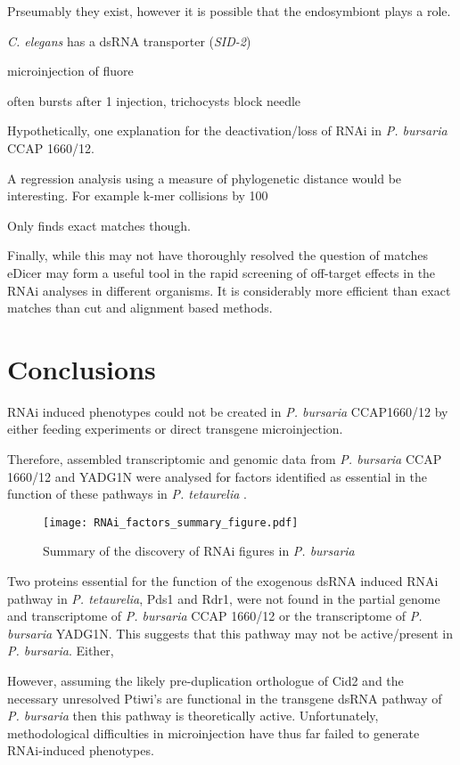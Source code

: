 Prseumably they exist, however it is possible that the endosymbiont plays a role.


\textit{C. elegans} has a dsRNA transporter (\textit{SID-2}) \citep{Nuez2012}


microinjection of fluore

often bursts after 1 injection, trichocysts block needle







Hypothetically, one explanation for the deactivation/loss
of RNAi in \textit{P. bursaria} CCAP 1660/12.




A regression analysis using a measure of phylogenetic distance would be interesting.
For example k-mer collisions by 100


Only finds exact matches though.




Finally, while this may not have thoroughly resolved the question of matches
eDicer may form a useful tool in the rapid screening of off-target effects
in the RNAi analyses in different organisms.   It is considerably
more efficient than exact matches 
than cut and alignment based methods. 





\section{Conclusions}

RNAi induced phenotypes could not be created in \textit{P. bursaria} CCAP1660/12
by either feeding experiments or direct transgene microinjection. 

Therefore, assembled transcriptomic and genomic data from \textit{P. bursaria}
CCAP 1660/12 and YADG1N were analysed for factors identified as essential in the function
of these pathways in \textit{P. tetaurelia} \citep{Marker2014}. 

\begin{figure}
    \texttt{[image: RNAi\_factors\_summary\_figure.pdf]}
    \caption[Summary of RNAi Factors Presence]{Summary of the discovery
    of RNAi figures in \textit{P. bursaria}}
    \label{fig:rnai_summary}
\end{figure}

Two proteins essential for the function of the exogenous dsRNA induced
RNAi pathway in \textit{P. tetaurelia}, Pds1 and Rdr1, were not found in the partial genome and transcriptome 
of \textit{P. bursaria} CCAP 1660/12 or the transcriptome of \textit{P. bursaria} YADG1N.
This suggests that this pathway may not be active/present in \textit{P. bursaria}.
Either, 


However, assuming the likely pre-duplication orthologue of Cid2 and the necessary 
unresolved Ptiwi's are functional
in the transgene dsRNA pathway of \textit{P. bursaria}
then this pathway is theoretically active.  Unfortunately, methodological
difficulties in microinjection have thus far failed to generate RNAi-induced
phenotypes.

